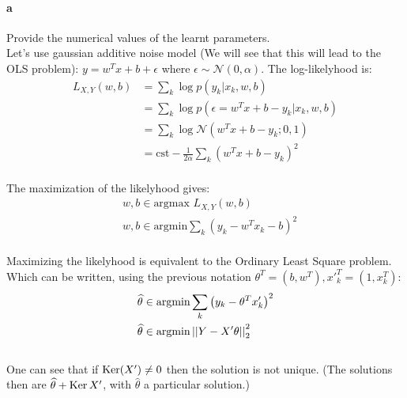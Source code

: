 \documentclass{article}
\begin{document}
\paragraph{a} Provide the numerical values of the learnt parameters.\vspace{10px}\\
Let's use gaussian additive noise model (We will see that this will lead to the OLS problem):
$y = w^Tx + b + \epsilon$ where $\epsilon \sim \mathcal{N}(0, \alpha)$. The log-likelyhood is:
\begin{equation*}
    \begin{aligned}
        L_{X, Y}(w, b) & = \sum_k \log p(y_k | x_k, w, b)                           \\
                       & = \sum_k \log p(\epsilon = w^Tx + b - y_k | x_k, w, b)     \\
                       & = \sum_k \log \mathcal{N}(w^Tx + b - y_k; 0, 1)            \\
                       & = \text{cst} - \frac{1}{2\alpha} \sum_k (w^Tx + b - y_k)^2
    \end{aligned}
\end{equation*}\\
The maximization of the likelyhood gives:
\begin{equation*}
    \begin{aligned}
         & w, b \in \text{argmax } L_{X, Y}(w, b)                        \\
         & w, b \in \text{argmin} \sum_k \left(y_k - w^Tx_k - b\right)^2
    \end{aligned}
\end{equation*}\\
Maximizing the likelyhood is equivalent to the Ordinary Least Square problem.
Which can be written, using the previous notation $\theta^T = (b, w^T), x'^T_k = (1, x_k^T)$:
\begin{equation*}
    \begin{aligned}
         & \widehat\theta \in \text{argmin} \sum_k \left(y_k - \theta^Tx'_k\right)^2 \\
         & \widehat\theta \in \text{argmin} \left|\left| Y - X'\theta \right|\right|_2^2
    \end{aligned}
\end{equation*}\\
One can see that if $\operatorname{Ker}(X') \neq {0}$ then the solution is not unique. (The solutions
then are $\widehat\theta + \operatorname{Ker}{X'}$, with $\widehat{\theta}$ a particular solution.)\\
\end{document}
